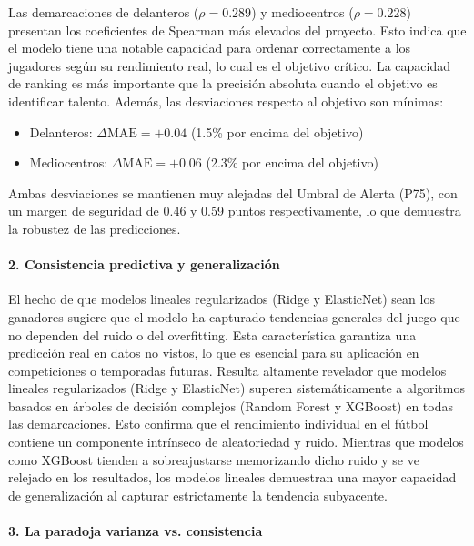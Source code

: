 Las demarcaciones de delanteros ($\rho = 0.289$) y mediocentros 
($\rho = 0.228$) presentan los coeficientes de Spearman más 
elevados del proyecto. Esto indica que el modelo tiene una 
notable capacidad para ordenar correctamente a los 
jugadores según su rendimiento real, lo cual es el objetivo 
crítico. La capacidad de ranking es más 
importante que la precisión absoluta cuando el objetivo es 
identificar talento. Además, las desviaciones respecto al objetivo son mínimas:
\begin{itemize}
  \item Delanteros: $\Delta \mathrm{MAE} = +0.04$ (1.5\% por encima 
        del objetivo)
  
  \item Mediocentros: $\Delta \mathrm{MAE} = +0.06$ (2.3\% por 
        encima del objetivo)
\end{itemize}

Ambas desviaciones se mantienen muy alejadas del Umbral de Alerta 
(P75), con un margen de seguridad de 0.46 y 0.59 puntos 
respectivamente, lo que demuestra la robustez de las 
predicciones.


\paragraph{2. Consistencia predictiva y generalización}

El hecho de que modelos lineales regularizados (Ridge y ElasticNet) 
sean los ganadores sugiere que el modelo ha capturado 
tendencias generales del juego que no dependen del ruido o del 
overfitting. Esta característica garantiza una predicción real en 
datos no vistos, lo que es esencial para su aplicación en 
competiciones o temporadas futuras. Resulta altamente revelador que modelos 
lineales regularizados (Ridge y 
ElasticNet) superen sistemáticamente a algoritmos basados en árboles de 
decisión complejos (Random Forest y XGBoost) en todas las demarcaciones. 
Esto confirma que el rendimiento individual en el fútbol contiene un 
componente intrínseco de aleatoriedad y ruido. Mientras que modelos como 
XGBoost tienden a sobreajustarse memorizando dicho ruido y se ve relejado en los resultados, 
los modelos lineales demuestran una mayor capacidad de generalización al 
capturar estrictamente la tendencia subyacente.

\paragraph{3. La paradoja varianza vs. consistencia}

